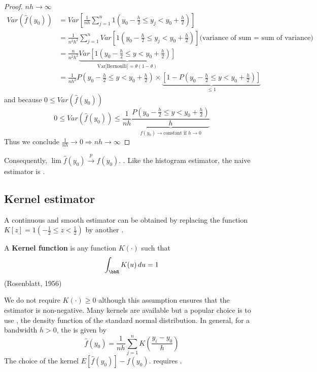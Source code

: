 \begin{proof}
    $nh\to\infty$
    \begin{align*}
        Var(\hat{f}(y_0)) & = Var\left[\frac{1}{nh}\sum_{j=1}^{n} 1\left(y_0-\frac{h}{2}\leq y_j<y_0+\frac{h}{2}\right)\right]\\
        & = \frac{1}{n^2h^2}\sum_{j=1}^{n}Var\left[1\left(y_0-\frac{h}{2}\leq y_j<y_0+\frac{h}{2}\right)\right] \text{(variance of sum = sum of variance)}\\
        & = \frac{n}{n^2h^2}\underbrace{Var\left[1\left(y_0-\frac{h}{2}\leq y<y_0+\frac{h}{2}\right)\right]}_{\text{Var[Bernoulli] = $\theta(1-\theta)$}}\\
        & = \frac{1}{nh^2} P\left(y_0-\frac{h}{2}\leq y<y_0+\frac{h}{2}\right) \times \underbrace{\left[1 - P\left(y_0-\frac{h}{2}\leq y<y_0+\frac{h}{2}\right)\right]}_{\leq 1}
    \end{align*}
    and because $0\leq Var(\hat{f}(y_0))$
    \begin{equation*}
        0\leq Var(\hat{f}(y_0))\leq \frac{1}{nh}\underbrace{\frac{P\left(y_0-\frac{h}{2}\leq y<y_0+\frac{h}{2}\right)}{h}}_{f(y_0)\to\text{constant if }h\to 0} 
    \end{equation*}
    Thus we conclude $\frac{1}{nh}\to 0 \Rightarrow nh\to\infty$
\end{proof}
Consequently, $\lim\hat{f}(y_0) \xrightarrow{p} f(y_0)$. 
.
Like the histogram estimator, the naive estimator is .

\subsection{Kernel estimator}

A continuous and smooth estimator can be obtained by replacing the function $K[z] = 1\left(-\frac{1}{2}\leq z < \frac{1}{2}\right)$ by another .

\begin{definition}
    A \textbf{Kernel function} is any function $K(\cdot)$ such that 
    \begin{equation*}
        \int_{\bbR}K(u)\, du = 1
    \end{equation*}
    (Rosenblatt, 1956)
\end{definition}

We do not require $K(\cdot)\geq 0$ although this assumption ensures that the estimator is non-negative.
Many kernels are available but a popular choice is to use , the density function of the standard normal distribution.
In general, for a bandwidth $h>0$, the  is given by 
\begin{equation*}
    \hat{f}(y_0) = \frac{1}{nh}\sum_{j=1}^{n}K\left(\frac{y_i-y_0}{h}\right)
\end{equation*}
The choice of the kernel  $E[\hat{f}(y_0)] - f(y_0)$.
 requires .\\

